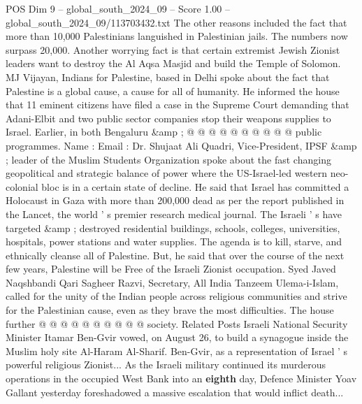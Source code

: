 \begin{textsample}{POS Dim 9 – global\_south\_2024\_09 – Score 1.00 – global\_south\_2024\_09/113703432.txt}
The other reasons included the fact that more than 10,000 Palestinians languished in Palestinian jails.
The numbers now surpass 20,000.
Another worrying fact is that certain extremist Jewish Zionist leaders want to destroy the Al Aqsa Masjid and build the Temple of Solomon.
MJ Vijayan, Indians for Palestine, based in Delhi spoke about the fact that Palestine is a global cause, a cause for all of humanity.
He informed the house that 11 eminent citizens have filed a case in the Supreme Court demanding that Adani-Elbit and two public sector companies stop their weapons supplies to Israel.
Earlier, in both Bengaluru \&amp ; @ @ @ @ @ @ @ @ @ @ public programmes.
Name : Email : Dr.
Shujaat Ali Quadri, Vice-President, IPSF \&amp ; leader of the Muslim Students Organization spoke about the fast changing geopolitical and strategic balance of power where the US-Israel-led western neo-colonial bloc is in a certain state of decline.
He said that Israel has committed a Holocaust in Gaza with more than 200,000 dead as per the report published in the Lancet, the world ' s premier research medical journal.
The Israeli ' s have targeted \&amp ; destroyed residential buildings, schools, colleges, universities, hospitals, power stations and water supplies.
The agenda is to kill, starve, and ethnically cleanse all of Palestine.
But, he said that over the course of the next few years, Palestine will be Free of the Israeli Zionist occupation.
Syed Javed Naqshbandi Qari Sagheer Razvi, Secretary, All India Tanzeem Ulema-i-Islam, called for the unity of the Indian people across religious communities and strive for the Palestinian cause, even as they brave the most difficulties.
The house further @ @ @ @ @ @ @ @ @ @ society.
Related Posts Israeli National Security Minister Itamar Ben-Gvir vowed, on August 26, to build a synagogue inside the Muslim holy site Al-Haram Al-Sharif.
Ben-Gvir, as a representation of Israel ' s powerful religious Zionist...
As the Israeli military continued its murderous operations in the occupied West Bank into an \textbf{eighth} day, Defence Minister Yoav Gallant yesterday foreshadowed a massive escalation that would inflict death...

\end{textsample}
